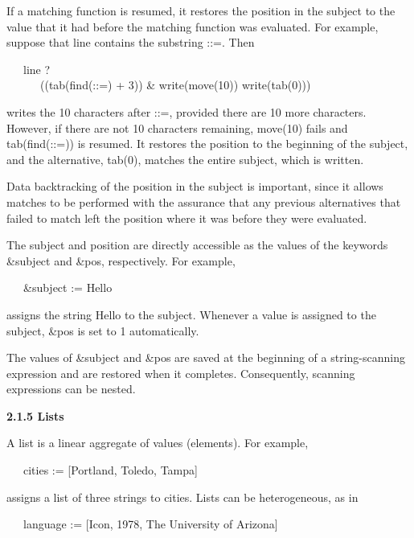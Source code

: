 If a matching function is resumed, it restores the position in the
subject to the value that it had before the matching function was
evaluated. For example, suppose that line contains the substring
{\textquotedbl}::={\textquotedbl}. Then

{\ttfamily\mdseries
\ \ \ line ? \\
\ \ \ \ \ \ ((tab(find({\textquotedbl}::={\textquotedbl}) + 3)) \& write(move(10)) {\textbar} write(tab(0)))}

\noindent writes the 10 characters after
{\textquotedbl}::={\textquotedbl}, provided there are 10 more
characters. However, if there are not 10 characters remaining,
move(10) fails and tab(find({\textquotedbl}::={\textquotedbl})) is
resumed. It restores the position to the beginning of the subject, and
the alternative, tab(0), matches the entire subject, which is written.

Data backtracking of the position in the subject is important, since
it allows matches to be performed with the assurance that any previous
alternatives that failed to match left the position where it was
before they were evaluated.

The subject and position are directly accessible as the values of the
keywords \&subject and \&pos, respectively. For example,

{\ttfamily\mdseries
\ \ \ \&subject := {\textquotedbl}Hello{\textquotedbl}}

\noindent assigns the string {\textquotedbl}Hello{\textquotedbl} to
the subject. Whenever a value is assigned to the subject, \&pos is set
to 1 automatically.

The values of \&subject and \&pos are saved at the beginning of a
string-scanning expression and are restored when it
completes. Consequently, scanning expressions can be nested.

{\sffamily\bfseries
2.1.5 Lists}


A list is a linear aggregate of values
({\textquotedbl}elements{\textquotedbl}). For example,

{\ttfamily\mdseries
\ \ \ cities := [{\textquotedbl}Portland{\textquotedbl}, {\textquotedbl}Toledo{\textquotedbl},
{\textquotedbl}Tampa{\textquotedbl}]}

\noindent
assigns a list of three strings to cities. Lists can be heterogeneous, as in

{\ttfamily\mdseries
\ \ \ language := [{\textquotedbl}Icon{\textquotedbl}, 1978, {\textquotedbl}The University of Arizona{\textquotedbl}]}

